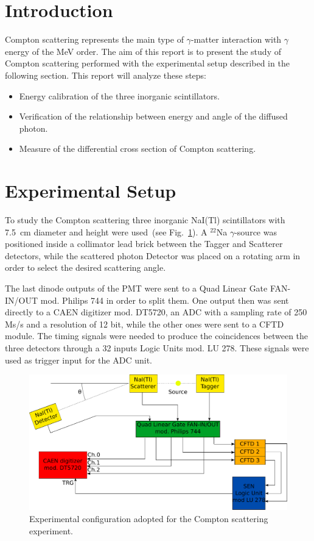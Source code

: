 \section*{Introduction}

Compton scattering represents the main  type of $\gamma$-matter interaction with $\gamma$ energy of the MeV order.   
The aim of this report is to present the study of Compton scattering performed with the experimental setup described in the following section.
This report will analyze these steps:
\begin{itemize}
	\item Energy calibration of the three inorganic scintillators.
	\item Verification of the relationship between energy and angle of the diffused photon.
	\item Measure of the differential cross section of Compton scattering.
\end{itemize}

\section*{Experimental Setup}

To study the Compton scattering three inorganic NaI(Tl) scintillators with 7.5~cm diameter and height were used~(see Fig.~\ref{Fig:Set_up}). A $^{22}$Na $\gamma$-source was positioned inside a collimator lead brick between the Tagger and Scatterer detectors, while the scattered photon Detector was placed on a rotating arm in order to select the desired scattering angle.

The last dinode outputs of the PMT were sent to a Quad Linear Gate FAN-IN/OUT mod. Philips 744 in order to split them. One output then was sent directly to a CAEN digitizer mod. DT5720, an ADC with a sampling rate of 250 Ms/s and a resolution of 12 bit, while the other ones were sent to a  CFTD module. The timing signals were needed to produce the coincidences between the three detectors through a 32 inputs Logic Units mod. LU 278. These signals were used as trigger input for the ADC unit.

\begin{figure}[h!]
	\centering
	\includegraphics[width=\textwidth]{immagini/SetUp.pdf}
	\caption{Experimental configuration adopted for the Compton scattering experiment.}
	\label{Fig:Set_up}
\end{figure}
